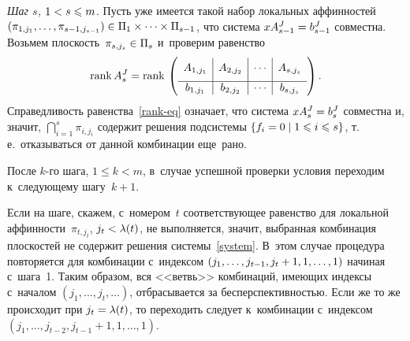 \begin{multicols}{2}

\textit{Шаг $s$, $1\hm<s\hm\leqslant m$.}
Пусть уже имеется такой набор локальных аффинностей $(\pi_{1,j_1},\ldots,
\pi_{s-1,j_{s-1}})\hm\in\Pi_1\times\cdots\times\Pi_{s-1}$, что
 система $xA^{J}_{s-1}\hm=b^{J}_{s-1}$ совместна.
Возьмем плоскость~$\pi_{s,j_s}\hm\in\Pi_s$ и~проверим равенство
\begin{equation}
\label{rank-eq}
  \rank A^{J}_s =
  \rank \left(\begin{array}{c|c|c|c}
                \rule{0pt}{1.2em} A_{1,j_1} & A_{2,j_2} & \cdots & 
A_{s,j_s}\\[6pt]
                \hline
                b_{1,j_1} & b_{2,j_2} & \cdots & b_{s,j_s}
              \end{array}\right).
\end{equation}
Справедливость равенства~\eqref{rank-eq} означает, что система 
$xA^{J}_s\hm=b^{J}_s$ совместна и, значит, $\bigcap_{i=1}^s \pi_{i,j_i}$ содержит 
решения подсистемы $\{f_i=0\mid 1\hm\leqslant i\hm\leqslant s\}$, т.\,е.\
 отказываться от данной комбинации еще~рано.

После $k$-го шага, $1\leqslant k<m$, в~случае успешной проверки условия переходим 
к~следующему шагу~$k+1$.

Если на шаге, скажем, с~номером~$t$ соответствующее равенство для локальной 
аффинности~$\pi_{t,j_t}$, $j_t\hm<\lambda(t)$, не выполняется, значит, выбранная\linebreak 
комбинация плоскостей не содержит решения сис\-те\-мы~\eqref{system}.
В~этом случае процедура повторяется для комбинации с~индексом $(j_1,\ldots,j_{t-
1},j_t\hm+1,1,\ldots,1)$ начиная с~шага~1. Таким образом, вся <<ветвь>> комбинаций, 
имеющих индексы с~началом $(j_1,\ldots,j_t,\ldots)$, отбрасывается за 
бес\-перспек\-тив\-ностью.
Если же то же происходит при $j_t\hm=\lambda(t)$, то переходить следует 
к~комбинации с~индексом $(j_1,\ldots,j_{t-2},j_{t-1}+1,1,\ldots,1)$.


\end{multicols}
